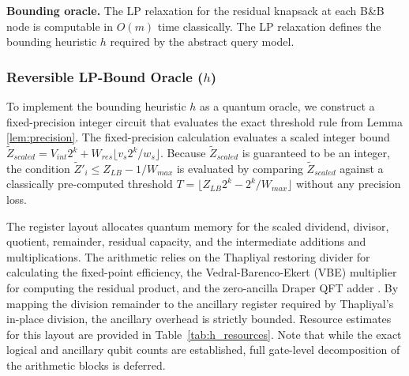 \documentclass[conference]{IEEEtran} \IEEEoverridecommandlockouts
\begin{document}
\textbf{Bounding oracle.} The LP relaxation for the residual knapsack at each B\&B node is computable in $O(m)$ time classically. The LP relaxation defines the bounding heuristic $h$ required by the abstract query model.

\subsubsection{Reversible LP-Bound Oracle ($h$)}

To implement the bounding heuristic $h$ as a quantum oracle, we construct a fixed-precision integer circuit that evaluates the exact threshold rule from Lemma \ref{lem:precision}. The fixed-precision calculation evaluates a scaled integer bound $\tilde{Z}_{scaled} = V_{int} 2^k + W_{res} \lfloor v_s 2^k / w_s \rfloor$. Because $\tilde{Z}_{scaled}$ is guaranteed to be an integer, the condition $\tilde{Z}'_i \le Z_{LB} - 1/W_{max}$ is evaluated by comparing $\tilde{Z}_{scaled}$ against a classically pre-computed threshold $T = \lfloor Z_{LB} 2^k - 2^k/W_{max} \rfloor$ without any precision loss.

The register layout allocates quantum memory for the scaled dividend, divisor, quotient, remainder, residual capacity, and the intermediate additions and multiplications. The arithmetic relies on the Thapliyal restoring divider \cite{thapliyal2016} for calculating the fixed-point efficiency, the Vedral-Barenco-Ekert (VBE) multiplier \cite{vedral1996} for computing the residual product, and the zero-ancilla Draper QFT adder \cite{draper2000}. By mapping the division remainder to the ancillary register required by Thapliyal's in-place division, the ancillary overhead is strictly bounded. Resource estimates for this layout are provided in Table~\ref{tab:h_resources}. Note that while the exact logical and ancillary qubit counts are established, full gate-level decomposition of the arithmetic blocks is deferred.
\end{document}
